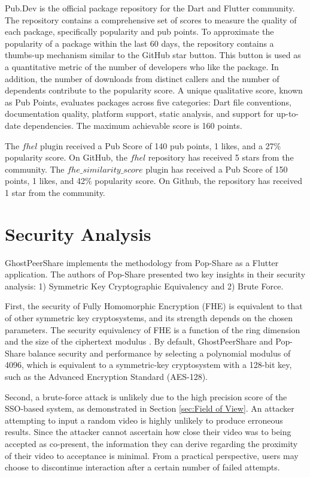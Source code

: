 Pub.Dev is the official package repository for the Dart and Flutter community. The repository contains a comprehensive set of scores to measure the quality of each package, specifically popularity and pub points. To approximate the popularity of a package within the last 60 days, the repository contains a thumbs-up mechanism similar to the GitHub star button. This button is used as a quantitative metric of the number of developers who like the package. In addition, the number of downloads from distinct callers and the number of dependents contribute to the popularity score. A unique qualitative score, known as Pub Points, evaluates packages across five categories: Dart file conventions, documentation quality, platform support, static analysis, and support for up-to-date dependencies. The maximum achievable score is 160 points.

The $fhel$ plugin received a Pub Score of 140 pub points, 1 likes, and a 27\% popularity score. On GitHub, the $fhel$ repository has received 5 stars from the community. The $fhe\_similarity\_score$ plugin has received a Pub Score of 150 points, 1 likes, and 42\% popularity score. On Github, the repository has received 1 star from the community.

\section{Security Analysis}


GhostPeerShare implements the methodology from Pop-Share as a Flutter application. The authors of Pop-Share presented two key insights in their security analysis: 1) Symmetric Key Cryptographic Equivalency and 2) Brute Force.

First, the security of Fully Homomorphic Encryption (FHE) is equivalent to that of other symmetric key cryptosystems, and its strength depends on the chosen parameters. The security equivalency of FHE is a function of the ring dimension and the size of the ciphertext modulus \cite{Albrecht2021-standard}. By default, GhostPeerShare and Pop-Share balance security and performance by selecting a polynomial modulus of 4096, which is equivalent to a symmetric-key cryptosystem with a 128-bit key, such as the Advanced Encryption Standard (AES-128).

Second, a brute-force attack is unlikely due to the high precision score of the SSO-based system, as demonstrated in Section \ref{sec:Field of View}. An attacker attempting to input a random video is highly unlikely to produce erroneous results. Since the attacker cannot ascertain how close their video was to being accepted as co-present, the information they can derive regarding the proximity of their video to acceptance is minimal. From a practical perspective, users may choose to discontinue interaction after a certain number of failed attempts.

